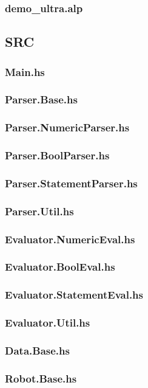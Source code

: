 \documentclass[a4paper,10pt]{article}
\begin{document}
    \subsubsection{demo\_ultra.alp}
      
  \subsection{SRC}
    \subsubsection{Main.hs}
      
    \subsubsection{Parser.Base.hs}
      
    \subsubsection{Parser.NumericParser.hs}
      
    \subsubsection{Parser.BoolParser.hs}
      
    \subsubsection{Parser.StatementParser.hs}
      
    \subsubsection{Parser.Util.hs}
      
    \subsubsection{Evaluator.NumericEval.hs}
      
    \subsubsection{Evaluator.BoolEval.hs}
      
    \subsubsection{Evaluator.StatementEval.hs}
      
    \subsubsection{Evaluator.Util.hs}
      
    \subsubsection{Data.Base.hs}
      
    \subsubsection{Robot.Base.hs}
      
  \restoregeometry
\end{document}
